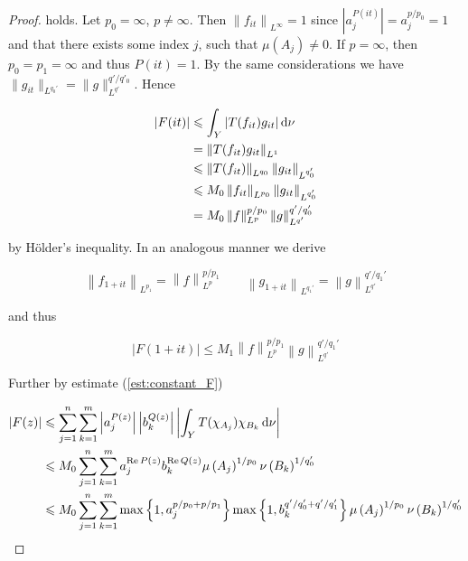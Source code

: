 \begin{proof}
holds. Let $p_0 = \infty$, $p \neq \infty$. Then $\left\|f_{it}\right\|_{L^{\infty}} = 1$ since $\left| a_j^{P(it)}\right| = a_j^{p/p_0} = 1$ and that there exists some index $j$, such that $\mu\left( A_j \right) \neq 0$. If $p = \infty$, then $p_0 = p_1 = \infty$ and thus $P(it) = 1$. By the same considerations we have $\|g_{it}\|_{L^{q_0'}} = \|g\|_{L^{q'}}^{q'/q'_0}$. Hence

\begin{gather*}
	\begin{aligned}
		\left| F(it) \right| &\leqslant \int_Y \left| T(f_{it})g_{it}\right| \mathop{}\!\mathrm{d}\nu\\
		&= \left\|T(f_{it}) g_{it}\right\|_{L^1}\\
		&\leqslant \left\|T(f_{it})\right\|_{L^{q_0}}\left\|g_{it}\right\|_{L^{q_0'}}\\
		&\leqslant M_0 \left\|f_{it}\right\|_{L^{p_0}} \left\|g_{it}\right\|_{L^{q_0'}}\\
		&= M_0 \left\|f\right\|_{L^p}^{p/p_0} \left\|g\right\|_{L^{q'}}^{q'/q'_0}
	\end{aligned}
\end{gather*}

by H\"older's inequality. In an analogous manner we derive
				
\begin{equation*}
	\left\|f_{1 + it}\right\|_{L^{p_1}} = \left\|f\right\|_{L^p}^{p/p_1} \qquad \left\|g_{1 + it}\right\|_{L^{q_1'}} = \left\|g\right\|_{L^{q'}}^{q'/q_1'}
\end{equation*}

and thus 
				
\begin{equation*}
	\left| F(1 + it)\right| \leqslant M_1 \left\|f\right\|_{L^p}^{p/p_1}\left\|g\right\|_{L^{q'}}^{q'/q_1'}
\end{equation*}	

Further by estimate (\ref{est:constant_F}) 

\begin{equation*}
	\begin{aligned}
		\left| F(z)\right| &\leqslant \sum_{j = 1}^n\sum_{k = 1}^m \left| a_j^{P(z)}\right| \left| b_k^{Q(z)}\right| \left| \int_Y T(\chi_{A_j})\chi_{B_k} \mathop{}\!\mathrm{d}\nu\right|\\
		&\leqslant M_0\sum_{j = 1}^n\sum_{k = 1}^m a_j^{\operatorname{Re} P(z)}b_k^{\operatorname{Re} Q(z)}\mu\left(A_j\right)^{1/p_0}\nu\left(B_k\right)^{1/q_0'}\\
		&\leqslant M_0\sum_{j = 1}^n\sum_{k = 1}^m \max\left\{ 1, a_j^{p/p_0 + p/p_1}\right\} \max\left\{1,b_k^{q'/q_0' + q'/q_1'}\right\}\mu\left(A_j\right)^{1/p_0}\nu\left(B_k\right)^{1/q_0'}
	\end{aligned}
\end{equation*}



\end{proof}

